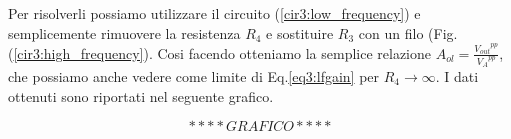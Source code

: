 Per risolverli possiamo utilizzare il circuito (\ref{cir3:low_frequency}) e semplicemente rimuovere la resistenza $R_4$ e sostituire $R_3$ con un filo (Fig. (\ref{cir3:high_frequency}). Cosi facendo otteniamo la semplice relazione $A_{ol}=\frac{{V_{out}}^{pp}}{{V_A}^{pp}}$, che possiamo anche vedere come limite di Eq.\ref{eq3:lfgain} per $R_4 \rightarrow \infty$. I dati ottenuti sono riportati nel seguente grafico. 




$$****GRAFICO****$$












